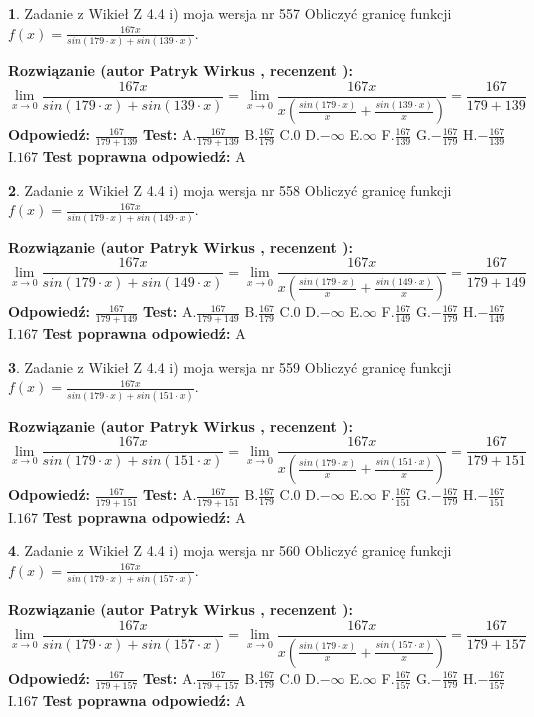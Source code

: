 \documentclass[12pt, a4paper]{article}
\theoremstyle{definition} %
\newtheorem{zad}{}
\newcommand{\zadStart}[1]{\begin{zad}#1\newline}
\newcommand{\zadStop}{\end{zad}}
\newcommand{\rozwStart}[2]{\noindent \textbf{Rozwiązanie (autor #1 , recenzent #2): }\newline}
\newcommand{\rozwStop}{\newline}
\newcommand{\odpStart}{\noindent \textbf{Odpowiedź:}\newline}
\newcommand{\odpStop}{\newline}
\newcommand{\testStart}{\noindent \textbf{Test:}\newline}
\newcommand{\testStop}{\newline}
\newcommand{\kluczStart}{\noindent \textbf{Test poprawna odpowiedź:}\newline}
\newcommand{\kluczStop}{\newline}
\begin{document}
\zadStart{Zadanie z Wikieł Z 4.4 i) moja wersja nr 557}
Obliczyć granicę funkcji $f(x)=\frac{167x}{sin(179\cdot x) +sin(139\cdot x)}$.
\zadStop
\rozwStart{Patryk Wirkus}{}
$$\lim\limits_{x\to 0}\frac{167x}{sin(179\cdot x) +sin(139\cdot x)}=\lim\limits_{x\to 0}\frac{167x}{x(\frac{sin(179\cdot x)}{x}+\frac{sin(139\cdot x)}{x})}=\frac{167}{179+139}$$
\rozwStop
\odpStart
$\frac{167}{179+139}$
\odpStop
\testStart
A.$\frac{167}{179+139}$
B.$\frac{167}{179}$
C.$0$
D.$-\infty$
E.$\infty$
F.$\frac{167}{139}$
G.$-\frac{167}{179}$
H.$-\frac{167}{139}$
I.$167$
\testStop
\kluczStart
A
\kluczStop



\zadStart{Zadanie z Wikieł Z 4.4 i) moja wersja nr 558}
Obliczyć granicę funkcji $f(x)=\frac{167x}{sin(179\cdot x) +sin(149\cdot x)}$.
\zadStop
\rozwStart{Patryk Wirkus}{}
$$\lim\limits_{x\to 0}\frac{167x}{sin(179\cdot x) +sin(149\cdot x)}=\lim\limits_{x\to 0}\frac{167x}{x(\frac{sin(179\cdot x)}{x}+\frac{sin(149\cdot x)}{x})}=\frac{167}{179+149}$$
\rozwStop
\odpStart
$\frac{167}{179+149}$
\odpStop
\testStart
A.$\frac{167}{179+149}$
B.$\frac{167}{179}$
C.$0$
D.$-\infty$
E.$\infty$
F.$\frac{167}{149}$
G.$-\frac{167}{179}$
H.$-\frac{167}{149}$
I.$167$
\testStop
\kluczStart
A
\kluczStop



\zadStart{Zadanie z Wikieł Z 4.4 i) moja wersja nr 559}
Obliczyć granicę funkcji $f(x)=\frac{167x}{sin(179\cdot x) +sin(151\cdot x)}$.
\zadStop
\rozwStart{Patryk Wirkus}{}
$$\lim\limits_{x\to 0}\frac{167x}{sin(179\cdot x) +sin(151\cdot x)}=\lim\limits_{x\to 0}\frac{167x}{x(\frac{sin(179\cdot x)}{x}+\frac{sin(151\cdot x)}{x})}=\frac{167}{179+151}$$
\rozwStop
\odpStart
$\frac{167}{179+151}$
\odpStop
\testStart
A.$\frac{167}{179+151}$
B.$\frac{167}{179}$
C.$0$
D.$-\infty$
E.$\infty$
F.$\frac{167}{151}$
G.$-\frac{167}{179}$
H.$-\frac{167}{151}$
I.$167$
\testStop
\kluczStart
A
\kluczStop



\zadStart{Zadanie z Wikieł Z 4.4 i) moja wersja nr 560}
Obliczyć granicę funkcji $f(x)=\frac{167x}{sin(179\cdot x) +sin(157\cdot x)}$.
\zadStop
\rozwStart{Patryk Wirkus}{}
$$\lim\limits_{x\to 0}\frac{167x}{sin(179\cdot x) +sin(157\cdot x)}=\lim\limits_{x\to 0}\frac{167x}{x(\frac{sin(179\cdot x)}{x}+\frac{sin(157\cdot x)}{x})}=\frac{167}{179+157}$$
\rozwStop
\odpStart
$\frac{167}{179+157}$
\odpStop
\testStart
A.$\frac{167}{179+157}$
B.$\frac{167}{179}$
C.$0$
D.$-\infty$
E.$\infty$
F.$\frac{167}{157}$
G.$-\frac{167}{179}$
H.$-\frac{167}{157}$
I.$167$
\testStop
\kluczStart
A
\kluczStop
\end{document}
